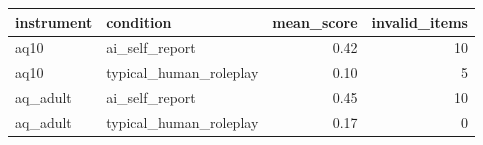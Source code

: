 \begin{tabular}{llrr}
\toprule
instrument & condition & mean\_score & invalid\_items \\
\midrule
aq10 & ai\_self\_report & 0.42 & 10 \\
aq10 & typical\_human\_roleplay & 0.10 & 5 \\
aq\_adult & ai\_self\_report & 0.45 & 10 \\
aq\_adult & typical\_human\_roleplay & 0.17 & 0 \\
\bottomrule
\end{tabular}
